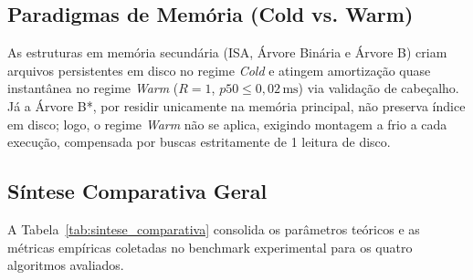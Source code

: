 \documentclass[12pt,a4paper]{article}
\begin{document}
\subsection{Paradigmas de Memória (Cold vs. Warm)}
As estruturas em memória secundária (ISA, Árvore Binária e Árvore B) criam arquivos persistentes em disco no regime \textit{Cold} e atingem amortização quase instantânea no regime \textit{Warm} ($R = 1$, $p50 \le 0{,}02\,\text{ms}$) via validação de cabeçalho. Já a Árvore B*, por residir unicamente na memória principal, não preserva índice em disco; logo, o regime \textit{Warm} não se aplica, exigindo montagem a frio a cada execução, compensada por buscas estritamente de 1 leitura de disco.

\subsection{Síntese Comparativa Geral}
A Tabela~\ref{tab:sintese_comparativa} consolida os parâmetros teóricos e as métricas empíricas coletadas no benchmark experimental para os quatro algoritmos avaliados.
\end{document}
